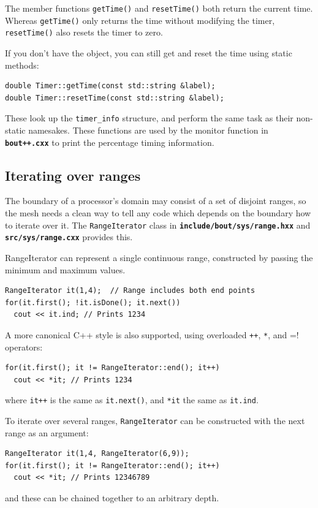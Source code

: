\documentclass[12pt]{article}
\newcommand{\file}[1]{\texttt{\bf #1}}
\begin{document}
The member functions \lstinline!getTime()! and \lstinline!resetTime()!
both return the current time. Whereas \lstinline!getTime()! only returns
the time without modifying the timer, \lstinline!resetTime()! also resets
the timer to zero. 

If you don't have the object, you can still get and reset the time using
static methods:
\begin{lstlisting}
double Timer::getTime(const std::string &label);
double Timer::resetTime(const std::string &label);
\end{lstlisting}
These look up the \lstinline!timer_info! structure, and perform
the same task as their non-static namesakes. These functions are used by the
monitor function in \file{bout++.cxx} to print the percentage timing information.

\subsection{Iterating over ranges}
\label{sec:rangeiterator}

The boundary of a processor's domain may consist of a set of disjoint ranges, so 
the mesh needs a clean way to tell any code which depends on the boundary how to iterate over it.
The \lstinline!RangeIterator! class in \file{include/bout/sys/range.hxx} and \file{src/sys/range.cxx}
provides this.

RangeIterator can represent a single continuous range, constructed by passing
the minimum and maximum values. 
\begin{lstlisting}
RangeIterator it(1,4);  // Range includes both end points
for(it.first(); !it.isDone(); it.next())
  cout << it.ind; // Prints 1234
\end{lstlisting}

A more canonical C++ style is also supported, using overloaded \lstinline!++!, \lstinline!*!, and \lstinline!!=!
operators:
\begin{lstlisting}
for(it.first(); it != RangeIterator::end(); it++)
  cout << *it; // Prints 1234
\end{lstlisting}
where \lstinline!it++! is the same as \lstinline!it.next()!, and \lstinline!*it! the same as \lstinline!it.ind!.

To iterate over several ranges, \lstinline!RangeIterator! can be constructed with the next range as an
argument:
\begin{lstlisting}
RangeIterator it(1,4, RangeIterator(6,9));
for(it.first(); it != RangeIterator::end(); it++)
  cout << *it; // Prints 12346789
\end{lstlisting}
and these can be chained together to an arbitrary depth.
\end{document}
